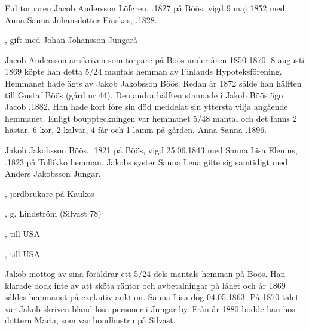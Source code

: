 F.d torparen Jacob Andersson Löfgren, .1827 på Böös, vigd 9 maj 1852 med Anna Sanna Johansdotter Finskas, .1828.
\begin{jhchildren}
  \item {}
  \item {}
  \item {}
  \item {}
  \item {}
  \item {}
  \item {}, gift med Johan Johansson Jungarå
  \item {}
\end{jhchildren}
Jacob Andersson är skriven som torpare på Böös under åren 1850-1870. 8 augusti 1869 köpte han detta 5/24 mantals hemman av Finlands Hypoteksförening. Hemmanet hade ägts av Jakob Jakobsson Böös. Redan år 1872 sålde han hälften till Gustaf Böös (gård nr 44). Den andra hälften stannade i Jakob Böös ägo. Jacob .1882. Han hade kort före sin död meddelat sin yttersta vilja angående hemmanet. Enligt bouppteckningen var hemmanet 5/48 mantal och det fanns 2 hästar, 6 kor, 2 kalvar, 4 får och 1 lamm på gården. Anna Sanna .1896.


Jakob Jakobsson Böös, .1821 på Böös, vigd 25.06.1843 med Sanna Lisa Elenius, .1823 på Tollikko hemman. Jakobs syster Sanna Lena gifte sig samtidigt med Anders Jakobsson Jungar.
\begin{jhchildren}
  \item {}, jordbrukare på Kaukos
  \item {}, g. Lindström (Silvast 78)
  \item {}
  \item {}, till USA
  \item {}
  \item {}
  \item {}, till USA
\end{jhchildren}
Jakob mottog av sina föräldrar ett 5/24 dels mantals hemman på Böös. Han klarade dock inte av att sköta räntor och avbetalningar på lånet och år 1869 såldes hemmanet på exekutiv auktion. Sanna Lisa dog 04.05.1863. På 1870-talet var Jakob skriven bland lösa personer i Jungar by. Från år 1880 bodde han hos dottern Maria, som var bondhustru på Silvast.

